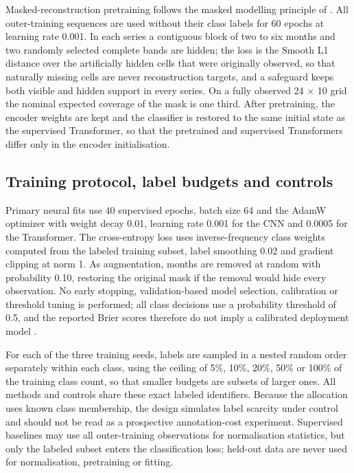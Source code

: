 \documentclass[10pt,a4paper,twocolumn]{article}
\begin{document}
Masked-reconstruction pretraining follows the masked modelling principle of \cite{ref3,ref14}. All outer-training sequences are used without their class labels for 60 epochs at learning rate 0.001. In each series a contiguous block of two to six months and two randomly selected complete bands are hidden; the loss is the Smooth L1 distance over the artificially hidden cells that were originally observed, so that naturally missing cells are never reconstruction targets, and a safeguard keeps both visible and hidden support in every series. On a fully observed 24 $\times$ 10 grid the nominal expected coverage of the mask is one third. After pretraining, the encoder weights are kept and the classifier is restored to the same initial state as the supervised Transformer, so that the pretrained and supervised Transformers differ only in the encoder initialisation.

\subsection{Training protocol, label budgets and controls}
Primary neural fits use 40 supervised epochs, batch size 64 and the AdamW optimizer with weight decay 0.01, learning rate 0.001 for the CNN and 0.0005 for the Transformer. The cross-entropy loss uses inverse-frequency class weights computed from the labeled training subset, label smoothing 0.02 and gradient clipping at norm 1. As augmentation, months are removed at random with probability 0.10, restoring the original mask if the removal would hide every observation. No early stopping, validation-based model selection, calibration or threshold tuning is performed; all class decisions use a probability threshold of 0.5, and the reported Brier scores therefore do not imply a calibrated deployment model \cite{ref6}.

For each of the three training seeds, labels are sampled in a nested random order separately within each class, using the ceiling of 5\%, 10\%, 20\%, 50\% or 100\% of the training class count, so that smaller budgets are subsets of larger ones. All methods and controls share these exact labeled identifiers. Because the allocation uses known class membership, the design simulates label scarcity under control and should not be read as a prospective annotation-cost experiment. Supervised baselines may use all outer-training observations for normalisation statistics, but only the labeled subset enters the classification loss; held-out data are never used for normalisation, pretraining or fitting.
\end{document}
